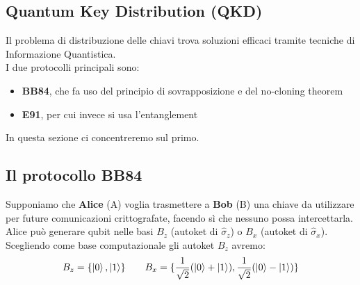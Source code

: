 \documentclass[../../InformazioneQuantistica.tex]{subfiles}
\begin{document}
\subsection{Quantum Key Distribution (QKD)}
Il problema di distribuzione delle chiavi trova soluzioni efficaci tramite tecniche di Informazione Quantistica.\\ I due protocolli principali sono:
\begin{itemize}
\item \textbf{BB84}, che fa uso del principio di sovrapposizione e del no-cloning theorem
\item \textbf{E91}, per cui invece si usa l'entanglement
\end{itemize}
In questa sezione ci concentreremo sul primo.

\subsection{Il protocollo BB84}
Supponiamo che \textbf{Alice} (A) voglia trasmettere a \textbf{Bob} (B) una chiave da utilizzare per future comunicazioni crittografate, facendo sì che nessuno possa intercettarla.\\

Alice può generare qubit nelle basi $B_z$ (autoket di $\hat{\sigma}_z$) o $B_x$ (autoket di $\hat{\sigma}_x$). Scegliendo come base computazionale gli autoket $B_z$ avremo:
\begin{align*}
B_z = \{\Ket{0}, \Ket{1}\} \qquad B_x =\{ \frac{1}{\sqrt{2}}(\Ket{0}+\Ket{1}), \frac{1}{\sqrt{2}}(\Ket{0}-\Ket{1})\}
\end{align*}
\end{document}
